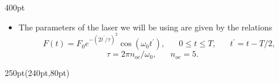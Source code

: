 \begin{frame}
\begin{textblock*}{400pt}
\begin{itemize}
\item The parameters of the laser we will be using 
are given by the relations
\begin{equation}
  F(t) = F_0 e^{-(2t^\prime/\tau)^2}\cos(\omega_0 t^\prime),
\hspace{20pt}  0 \leqslant t \leqslant T,
\hspace{20pt}  t^{\prime} = t - T/2,
\end{equation}
\begin{equation}
  \tau  = 2\pi n_{oc}/\omega_0,  \hspace{20pt}
  n_{oc} = 5. \hspace{20pt}
\end{equation}
\end{itemize}

\end{textblock*}

\begin{textblock*}{250pt}(240pt,80pt)
\end{textblock*}

\end{frame}




